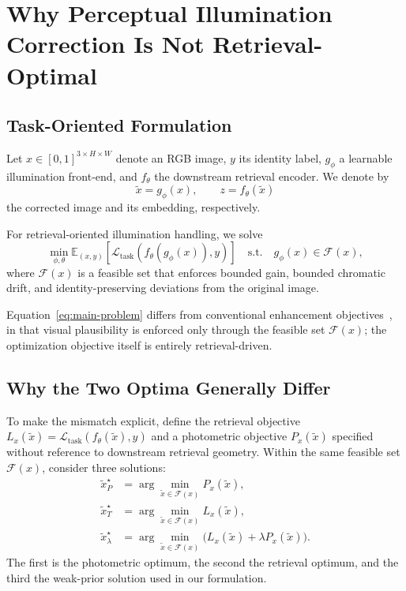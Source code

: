 \documentclass[sigconf,screen,review,anonymous]{acmart}
\begin{document}
\section{Why Perceptual Illumination Correction Is Not Retrieval-Optimal}

\subsection{Task-Oriented Formulation}

Let $x \in [0,1]^{3 \times H \times W}$ denote an RGB image, $y$ its identity
label, $g_{\phi}$ a learnable illumination front-end, and $f_{\theta}$ the
downstream retrieval encoder.
We denote by
\begin{equation}
  \tilde{x} = g_{\phi}(x), \qquad z = f_{\theta}(\tilde{x})
\end{equation}
the corrected image and its embedding, respectively.

For retrieval-oriented illumination handling, we solve
\begin{equation}
  \min_{\phi,\theta}
  \mathbb{E}_{(x,y)} \left[ \mathcal{L}_{\text{task}}(f_{\theta}(g_{\phi}(x)), y) \right]
  \quad
  \text{s.t.}
  \quad
  g_{\phi}(x) \in \mathcal{F}(x),
  \label{eq:main-problem}
\end{equation}
where $\mathcal{F}(x)$ is a feasible set that enforces bounded gain, bounded
chromatic drift, and identity-preserving deviations from the original image.

Equation~\eqref{eq:main-problem} differs from conventional enhancement
objectives~\cite{wei2018retinexnet,guo2020zerodce,jiang2021enlightengan,cai2023retinexformer,yi2023diffretinex},
in that visual plausibility is enforced only through the feasible set
$\mathcal{F}(x)$; the optimization objective itself is entirely
retrieval-driven.

\subsection{Why the Two Optima Generally Differ}

To make the mismatch explicit, define the retrieval objective
$L_x(\tilde{x}) = \mathcal{L}_{\text{task}}(f_{\theta}(\tilde{x}), y)$
and a photometric objective $P_x(\tilde{x})$ specified without reference to
downstream retrieval geometry.
Within the same feasible set $\mathcal{F}(x)$, consider three solutions:
\[
\begin{aligned}
  \tilde{x}_P^{\star}
  &=
  \arg\min_{\tilde{x} \in \mathcal{F}(x)} P_x(\tilde{x}), \\
  \tilde{x}_T^{\star}
  &=
  \arg\min_{\tilde{x} \in \mathcal{F}(x)} L_x(\tilde{x}), \\
  \tilde{x}_{\lambda}^{\star}
  &=
  \arg\min_{\tilde{x} \in \mathcal{F}(x)}
  \bigl(L_x(\tilde{x}) + \lambda P_x(\tilde{x})\bigr).
\end{aligned}
\]
The first is the photometric optimum, the second the retrieval optimum, and
the third the weak-prior solution used in our formulation.
\end{document}
